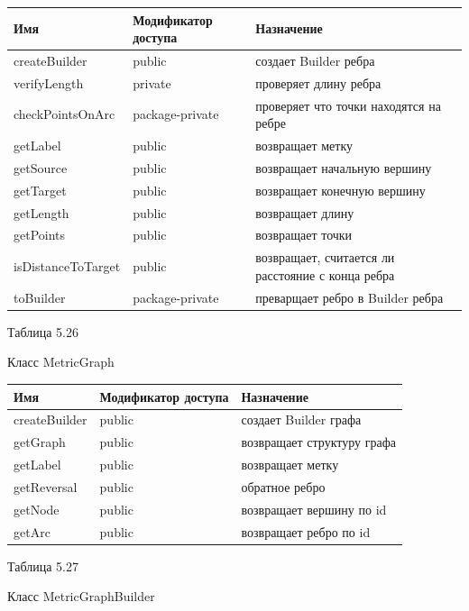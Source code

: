 \documentclass{../TechDoc}
\begin{document}
	\begin{tabular}{|p{5cm}|p{5cm}|p{5cm}|}
		\hline
		\textbf{Имя} & \textbf{Модификатор доступа} & \textbf{Назначение} \\
		\hline
		createBuilder& public & создает Builder ребра\\
		\hline
		verifyLength& private & проверяет длину ребра\\
		\hline
		checkPointsOnArc& package-private& проверяет что точки находятся на ребре\\
		\hline
		getLabel&public & возвращает метку\\
		\hline
		getSource&public & возвращает начальную вершину\\
		\hline
		getTarget&public & возвращает конечную вершину\\
		\hline
		getLength& public& возвращает длину\\
		\hline
		getPoints&public & возвращает точки\\
		\hline
		isDistanceToTarget&public & возвращает, считается ли расстояние с конца ребра\\
		\hline
		toBuilder&package-private & преварщает ребро в Builder ребра\\
		
		\hline
	\end{tabular}
	\begin{flushright}
		Таблица 5.26
	\end{flushright}
	Класс MetricGraph
	
	\begin{tabular}{|p{5cm}|p{5cm}|p{5cm}|}
		\hline
		\textbf{Имя} & \textbf{Модификатор доступа} & \textbf{Назначение} \\
		\hline
		createBuilder& public & создает Builder графа\\
		\hline
		getGraph&public & возвращает структуру графа\\
		\hline
		getLabel&public & возвращает метку\\
		\hline
		getReversal&public & обратное ребро\\
		\hline
		getNode& public& возвращает вершину по id\\
		\hline
		getArc& public& возвращает ребро по id\\
		
		\hline
	\end{tabular}
	\begin{flushright}
		Таблица 5.27
	\end{flushright}
	Класс MetricGraphBuilder
	
\end{document}
